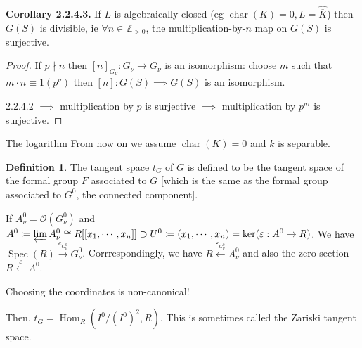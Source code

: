 \documentclass{article}
\theoremstyle{definition}
\newtheorem*{definition}{Definition}
\numberwithin{theorem}{subsection}
\begin{document}
    \textbf{Corollary 2.2.4.3.} If \(L\) is algebraically closed (eg \(\operatorname{char} (K) = 0, L = \widehat{\overline{K}}\)) then \(G(S)\) is divisible, ie \(\forall n\in \mathbb{Z}_{>0}\), the multiplication-by-\(n\) map on \(G(S)\) is surjective.
    
    \begin{proof}
        If \(p\nmid n\) then \([n]_{G_\nu}: G_\nu \to G_\nu\) is an isomorphism: choose \(m\) such that \(m \cdot n \equiv 1(p^\nu)\) then \([n]: G(S) \implies G(S)\) is an isomorphism.

        2.2.4.2 \(\implies\) multiplication by \(p\) is surjective \(\implies\) multiplication by \(p^m\) is surjective.
    \end{proof}

    \underline{The logarithm} From now on we assume \(\operatorname{char} (K)=0\) and \(k\) is separable.

    \begin{definition}
        The \underline{tangent space} \(t_G\) of \(G\) is defined to be the tangent space of the formal group \(F\) associated to \(G\) [which is the same as the formal group associated to \(G^0\), the connected component].

        If \(A_\nu^0 = \mathcal{O} (G^0_\nu)\) and \(A^0 \coloneqq \varprojlim A^0_\nu \cong R[[x_1, \cdots , x_n]] \supset U^0 \coloneqq (x_1, \cdots , x_n) = \ker (\varepsilon: A^0 \to R)\). We have \(\operatorname{Spec}(R)  \xrightarrow{e_{G^0_\nu}} G_\nu^0\). Corrrespondingly, we have \(R \xleftarrow{\varepsilon_{G_\nu^0}} A^0_\nu\) and also the zero section \(R\xleftarrow{\varepsilon} A^0\).
        
        Choosing the coordinates is non-canonical!

        Then, \(t_G = \operatorname{Hom}_R (I^0 / (I^0)^2, R)\). This is sometimes called the Zariski tangent space.
    \end{definition}
\end{document}
